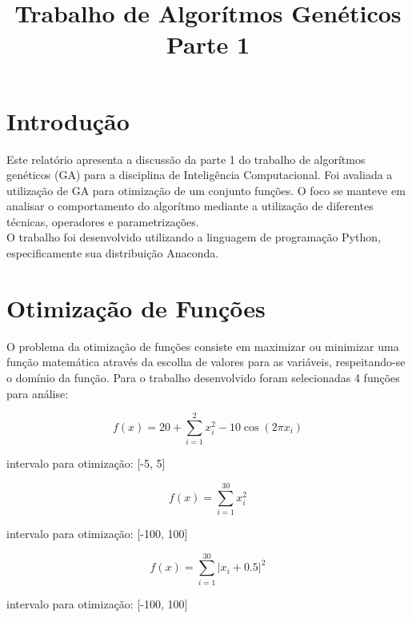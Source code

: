 \documentclass[conference]{IEEEtran}
\begin{document}
\title{Trabalho de Algorítmos Genéticos\\ Parte 1}


\author{
}

\maketitle


\section{Introdução}
Este relatório apresenta a discussão da parte 1 do trabalho de algorítmos 
genéticos (GA) para a disciplina de Inteligência Computacional. Foi avaliada a 
utilização de GA para otimização de um conjunto funções. O foco se manteve em 
analisar o comportamento do algorítmo mediante a utilização de 
diferentes técnicas, operadores e parametrizações.\\
O trabalho foi desenvolvido utilizando a linguagem de programação Python,
especificamente sua distribuição Anaconda.\\


\section{Otimização de Funções}
O problema da otimização de funções consiste em maximizar ou minimizar uma 
função matemática através da escolha de valores para as variáveis, 
respeitando-se o domínio da função.
Para o trabalho desenvolvido foram selecionadas 4 funções para análise:

\[f(x) = 20 + \sum_{i=1}^{2} x_{i}^{2} - 10\cos(2\pi x_i)\]
\begin{center}intervalo para otimização: [-5, 5]\\\end{center}

\[f(x) = \sum_{i=1}^{30} x_{i}^{2}\]
\begin{center}intervalo para otimização: [-100, 100]\\\end{center}

\[f(x) = \sum_{i=1}^{30} \left|x_i + 0.5\right|^{2}\]
\begin{center}intervalo para otimização: [-100, 100]\\\end{center}
\end{document}
